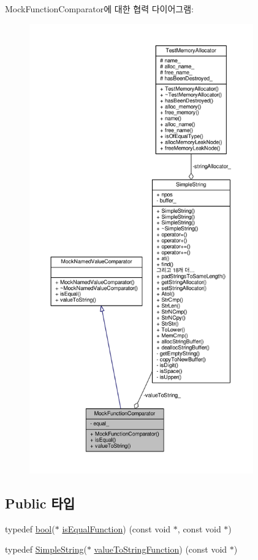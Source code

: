 Mock\+Function\+Comparator에 대한 협력 다이어그램\+:
\nopagebreak
\begin{figure}[H]
\begin{center}
\leavevmode
\includegraphics[height=550pt]{class_mock_function_comparator__coll__graph}
\end{center}
\end{figure}
\subsection*{Public 타입}
\begin{DoxyCompactItemize}
\item 
typedef \hyperlink{avb__gptp_8h_af6a258d8f3ee5206d682d799316314b1}{bool}($\ast$ \hyperlink{class_mock_function_comparator_a992fcad14d02c8565ff25c091499fce8}{is\+Equal\+Function}) (const void $\ast$, const void $\ast$)
\item 
typedef \hyperlink{class_simple_string}{Simple\+String}($\ast$ \hyperlink{class_mock_function_comparator_ae46da1e1cc5f591e2fefb68361dbe33e}{value\+To\+String\+Function}) (const void $\ast$)
\end{DoxyCompactItemize}
